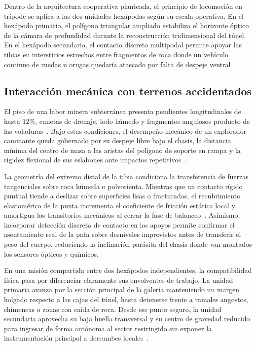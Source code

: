 Dentro de la arquitectura cooperativa planteada, el principio de locomoción en trípode se aplica a las dos unidades hexápodas según su escala operativa. En el hexápodo primario, el polígono triangular ampliado estabiliza el horizonte óptico de la cámara de profundidad durante la reconstrucción tridimensional del túnel. En el hexápodo secundario, el contacto discreto multipodal permite apoyar las tibias en intersticios estrechos entre fragmentos de roca donde un vehículo continuo de ruedas u orugas quedaría atascado por falta de despeje ventral~\cite{campion1996structural, James2021_InsectLegDesign, Huang2022_micromachines}.

\subsection{Interacción mecánica con terrenos accidentados}

El piso de una labor minera subterránea presenta pendientes longitudinales de hasta $12\%$, cunetas de drenaje, lodo húmedo y fragmentos angulosos producto de las voladuras~\cite{MINEM_DS024_2016, AdvancesMining_2023}. Bajo estas condiciones, el desempeño mecánico de un explorador caminante queda gobernado por su despeje libre bajo el chasis, la distancia mínima del centro de masa a las aristas del polígono de soporte en rampa y la rigidez flexional de sus eslabones ante impactos repetitivos~\cite{Wang2022_Energies_Hexapod, PutraWidodo2023_Hexapod}.

La geometría del extremo distal de la tibia condiciona la transferencia de fuerzas tangenciales sobre roca húmeda o polvorienta. Mientras que un contacto rígido puntual tiende a deslizar sobre superficies lisas o fracturadas, el recubrimiento elastomérico de la punta incrementa el coeficiente de fricción estática local y amortigua los transitorios mecánicos al cerrar la fase de balanceo~\cite{Zhou2023_BioinspiredSensors}. Asimismo, incorporar detección discreta de contacto en los apoyos permite confirmar el asentamiento real de la pata sobre desniveles imprevistos antes de transferir el peso del cuerpo, reduciendo la inclinación parásita del chasis donde van montados los sensores ópticos y químicos.

En una misión compartida entre dos hexápodos independientes, la compatibilidad física pasa por diferenciar claramente sus envolventes de trabajo. La unidad primaria avanza por la sección principal de la galería manteniendo un margen holgado respecto a las cajas del túnel, hasta detenerse frente a ramales angostos, chimeneas o zonas con caída de roca. Desde ese punto seguro, la unidad secundaria aprovecha su baja huella transversal y su centro de gravedad reducido para ingresar de forma autónoma al sector restringido sin exponer la instrumentación principal a derrumbes locales~\cite{Obosu2025_Automation, AdvancesMining_2023}.

